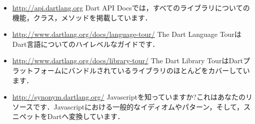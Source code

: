 \begin{itemize}
\item \url{http://api.dartlang.org} Dart API Docsでは，すべてのライブラリについての機能，クラス，メソッドを掲載しています．
\item \url{http://www.dartlang.org/docs/language-tour/} The Dart Language TourはDart言語についてのハイレベルなガイドです．
\item \url{http://www.dartlang.org/docs/library-tour/} The Dart Library TourはDartプラットフォームにバンドルされているライブラリのほとんどをカバーしています．
\item \url{http://synonym.dartlang.org/} Javascriptを知っていますか?これはあなたのリソースです．Javascriptにおける一般的なイディオムやパターン，そして，スニペットをDartへ変換しています．
\end{itemize}

